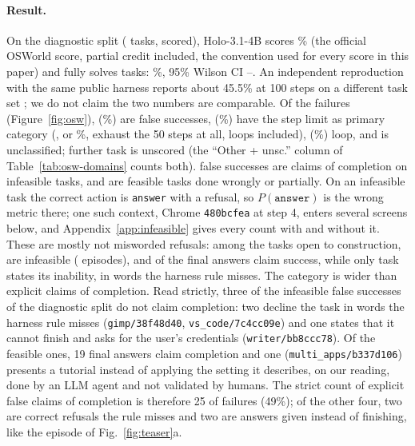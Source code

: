 \paragraph{Result.} On the diagnostic split (\oswNTasks{} tasks, \oswNScored{} scored), Holo-3.1-4B scores \oswMeanScorePct\% (the official OSWorld score, partial credit included, the convention used for every score in this paper) and fully solves \oswNSuccess{} tasks: \oswSuccessPct\%, 95\% Wilson CI \oswSuccessLo--\oswSuccessHi. An independent reproduction with the same public harness reports about 45.5\% at 100 steps on a different task set \citep{realtimegui}; we do not claim the two numbers are comparable. %
Of the \oswNFail{} failures (Figure~\ref{fig:osw}), \oswCatFalseSuccess{} (\oswFsPct\%) are false successes, \oswCatStepLimit{} (\oswStepPct\%) have the step limit as primary category (\oswStepAny, or \oswStepAnyPct\%, exhaust the 50 steps at all, loops included), \oswCatLoop{} (\oswLoopPct\%) loop, and \oswCatOther{} is unclassified; \oswNUnscored{} further task is unscored (the ``Other + unsc.'' column of Table~\ref{tab:osw-domains} counts both). \oswFsInfeasible{} false successes are claims of completion on infeasible tasks, and \oswFsFeasible{} are feasible tasks done wrongly or partially. On an infeasible task the correct action is \texttt{answer} with a refusal, so $P(\texttt{answer})$ is the wrong metric there; one such context, Chrome \texttt{480bcfea} at step 4, enters several screens below, and Appendix~\ref{app:infeasible} gives every count with and without it. These are mostly not misworded refusals: among the \infAllowed{} tasks open to construction, \infTasks{} are infeasible (\infEpisodes{} episodes), and of the \infAnswered{} final answers \infClaim{} claim success, while only \infInabilityTasks{} task states its inability, in words the harness rule misses. %
The category is wider than explicit claims of completion. Read strictly, three of the \oswFsInfeasible{} infeasible false successes of the diagnostic split do not claim completion: two decline the task in words the harness rule misses (\texttt{gimp/38f48d40}, \texttt{vs\_code/7c4cc09e}) and one states that it cannot finish and asks for the user's credentials (\texttt{writer/bb8ccc78}). Of the \oswFsFeasible{} feasible ones, 19 final answers claim completion and one (\texttt{multi\_apps/b337d106}) presents a tutorial instead of applying the setting it describes, on our reading, done by an LLM agent and not validated by humans. The strict count of explicit false claims of completion is therefore 25 of \oswNFail{} failures (49\%); of the other four, two are correct refusals the rule misses and two are answers given instead of finishing, like the episode of Fig.~\ref{fig:teaser}a. %
